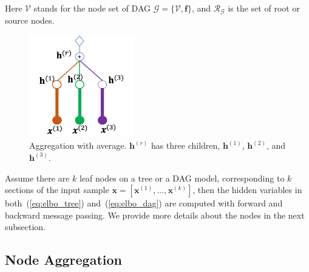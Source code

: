 \documentclass[twoside]{article}
\begin{document}
Here $\mathcal{V}$ stands for the node set of DAG $\mathcal{G} = \{\mathcal{V}, \mathbf{f}\}$, and $\mathcal{R}_{ \mathcal{G}}$ is the set of root or source nodes. 
 
\begin{figure}[H]
\begin{center}
 \includegraphics[width=1.8in]{fig/node_aggre_avg.png}
\end{center}
   \caption{Aggregation with average. $\mathbf{h}^{(r)}$ has three children, $\mathbf{h}^{(1)}$, $\mathbf{h}^{(2)}$, and $\mathbf{h}^{(3)}$.}
\label{fig:node_aggre}
\end{figure}

Assume there are $k$ leaf nodes on a tree or a DAG model, corresponding to $k$ sections of the input sample $\mathbf{x} = [\mathbf{x}^{(1)}, ..., \mathbf{x}^{(k)}]$, then the hidden variables in both~(\ref{eq:elbo_tree}) and~(\ref{eq:elbo_dag}) are computed with forward and backward message passing. 
We provide more details about the nodes in the next subsection.

\subsection{Node Aggregation}\label{sec:node_aggr}
\end{document}
